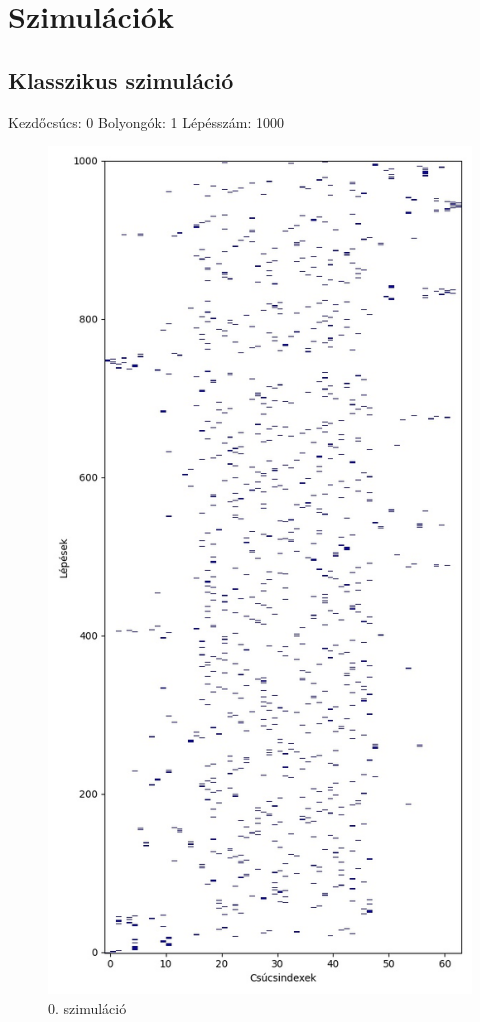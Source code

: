 \documentclass[14pt,a4paper]{article}
\begin{document}
\section{Szimulációk}
\subsection{Klasszikus szimuláció}
Kezdőcsúcs: 0
Bolyongók: 1
Lépésszám: 1000
\begin{figure}[H]
\centering
\includegraphics[width = 0.7\columnwidth]{sim00.jpg}
\caption{0. szimuláció}
\end{figure}
\end{document}
